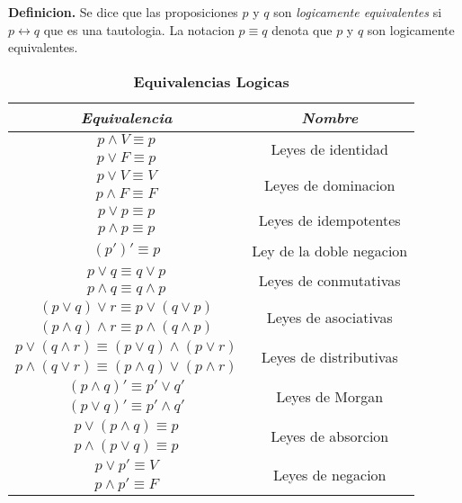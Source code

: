 \documentclass[]{article}
\begin{document}
\textbf{Definicion.} Se dice que las proposiciones $p$ y $q$ son \textit{logicamente equivalentes} si $p \leftrightarrow q$ que es una tautologia. La notacion $p \equiv q$ denota que $p$ y $q$ son logicamente equivalentes.

\begin{table}[H]
	\caption*{\textbf{Equivalencias Logicas}}
	\parbox{.5\linewidth}{
	\begin{center}
		\label{tab:equivalencias-logicas}
		\begin{tabular}{|c|c|}
			\hline
			\textit{Equivalencia} & \textit{Nombre} \\
			\hline
			$p\wedge V \equiv p$ & \multirow{2}{*}{Leyes de identidad} \\
			$p\vee F \equiv p$ & \\
			\hline
			$p\vee V \equiv V$ & \multirow{2}{*}{Leyes de dominacion} \\
			$p\wedge F \equiv F$ & \\
			\hline
			$p\vee p \equiv p$ & \multirow{2}{*}{Leyes de idempotentes} \\
			$p\wedge p \equiv p$ & \\
			\hline
			$(p')' \equiv p$ & Ley de la doble negacion\\
			\hline
			$p\vee q \equiv q\vee p$ & \multirow{2}{*}{Leyes de conmutativas} \\
			$p\wedge q \equiv q\wedge p$ & \\
			\hline
			$(p\vee q)\vee r \equiv p \vee(q\vee p)$ & \multirow{2}{*}{Leyes de asociativas} \\
			$(p\wedge q)\wedge r \equiv p \wedge(q\wedge p)$ & \\
			\hline
			$p \vee (q \wedge r) \equiv (p\vee q) \wedge (p \vee r)$ & \multirow{2}{*}{Leyes de distributivas} \\
			$p \wedge (q \vee r) \equiv (p \wedge q) \vee (p \wedge r)$ & \\
			\hline
			$(p \wedge q)' \equiv p' \vee q'$ & \multirow{2}{*}{Leyes de Morgan} \\
			$(p \vee q)' \equiv p' \wedge q'$ & \\
			\hline
			$p \vee (p \wedge q) \equiv p$ & \multirow{2}{*}{Leyes de absorcion} \\
			$p \wedge (p \vee q) \equiv p$ & \\
			\hline
			$p\vee p' \equiv V$ & \multirow{2}{*}{Leyes de negacion} \\
			$p\wedge p' \equiv F$ & \\
			\hline
		\end{tabular}

\end{center}}
\end{table}
\end{document}
